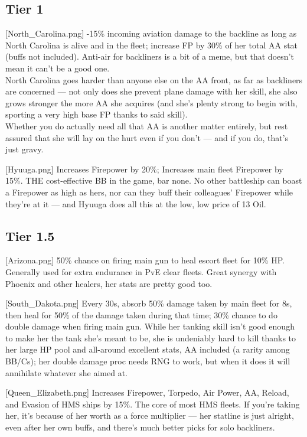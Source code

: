 \newpage
\subsection{Tier 1}
[North_Carolina.png]
{-15\% incoming aviation damage to the backline as long as North Carolina is alive and in the fleet; increase FP by 30\% of her total AA stat (buffs not included).}
{}
{Anti-air for backliners is a bit of a meme, but that doesn't mean it can't be a good one.\\
North Carolina goes harder than anyone else on the AA front, as far as backliners are concerned --- not only does she prevent plane damage with her skill, she also grows stronger the more AA she acquires (and she's plenty strong to begin with, sporting a very high base FP thanks to said skill).\\
Whether you do actually need all that AA is another matter entirely, but rest assured that she will lay on the hurt even if you don't --- and if you do, that's just gravy.}

[Hyuuga.png]
{Increases Firepower by 20\%; Increases main fleet Firepower by 15\%.}
{}
{THE cost-effective BB in the game, bar none. No other battleship can boast a Firepower as high as hers, nor can they buff their colleagues' Firepower while they're at it --- and Hyuuga does all this at the low, low price of 13 Oil.}

 
\newpage
\subsection{Tier 1.5}
[Arizona.png]
{50\% chance on firing main gun to heal escort fleet for 10\% HP.}
{}
{Generally used for extra endurance in PvE clear fleets. Great synergy with Phoenix and other healers, her stats are pretty good too.}

[South_Dakota.png]
{Every 30s, absorb 50\% damage taken by main fleet for 8s, then heal for 50\% of the damage taken during that time; 30\% chance to do double damage when firing main gun.}
{}
{While her tanking skill isn't good enough to make her the tank she's meant to be, she is undeniably hard to kill thanks to her large HP pool and all-around excellent stats, AA included (a rarity among BB/Cs); her double damage proc needs RNG to work, but when it does it will annihilate whatever she aimed at.}

[Queen_Elizabeth.png]
{Increases Firepower, Torpedo, Air Power, AA, Reload, and Evasion of HMS ships by 15\%.}
{}
{The core of most HMS fleets. If you're taking her, it's because of her worth as a force multiplier --- her statline is just alright, even after her own buffs, and there's much better picks for solo backliners.}

